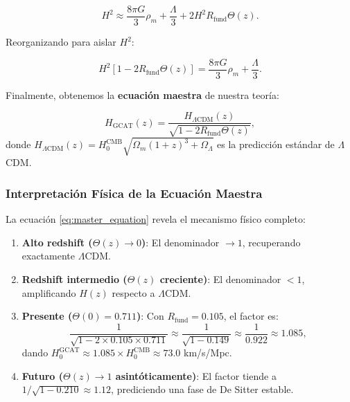 \documentclass[12pt, a4paper]{article}
\theoremstyle{plain}
\theoremstyle{definition}
\begin{document}
\begin{equation}
H^2 \approx \frac{8\pi G}{3} \rho_m + \frac{\Lambda}{3} + 2H^2 R_{\text{fund}} \Theta(z).
\end{equation}

Reorganizando para aislar $H^2$:

\begin{equation}
H^2 \left[ 1 - 2 R_{\text{fund}} \Theta(z) \right] = \frac{8\pi G}{3} \rho_m + \frac{\Lambda}{3}.
\end{equation}

Finalmente, obtenemos la \textbf{ecuación maestra} de nuestra teoría:

\begin{equation}
H_{\text{GCAT}}(z) = \frac{H_{\Lambda\text{CDM}}(z)}{\sqrt{1 - 2 R_{\text{fund}} \Theta(z)}},
\label{eq:master_equation}
\end{equation}
donde $H_{\Lambda\text{CDM}}(z) = H_0^{\text{CMB}} \sqrt{\Omega_m(1+z)^3 + \Omega_\Lambda}$ es la predicción estándar de $\Lambda$CDM.

\subsubsection{Interpretación Física de la Ecuación Maestra}

La ecuación \eqref{eq:master_equation} revela el mecanismo físico completo:

\begin{enumerate}
    \item \textbf{Alto redshift ($\Theta(z) \to 0$)}: El denominador $\to 1$, recuperando exactamente $\Lambda$CDM.
    
    \item \textbf{Redshift intermedio ($\Theta(z)$ creciente)}: El denominador $< 1$, amplificando $H(z)$ respecto a $\Lambda$CDM.
    
    \item \textbf{Presente ($\Theta(0) = 0.711$)}: Con $R_{\text{fund}} = 0.105$, el factor es:
    \begin{equation}
    \frac{1}{\sqrt{1 - 2 \times 0.105 \times 0.711}} \approx \frac{1}{\sqrt{1 - 0.149}} \approx \frac{1}{0.922} \approx 1.085,
    \end{equation}
    dando $H_0^{\text{GCAT}} \approx 1.085 \times H_0^{\text{CMB}} \approx 73.0$ km/s/Mpc.
    
    \item \textbf{Futuro ($\Theta(z) \to 1$ asintóticamente)}: El factor tiende a $1/\sqrt{1 - 0.210} \approx 1.12$, prediciendo una fase de De Sitter estable.
\end{enumerate}
\end{document}
